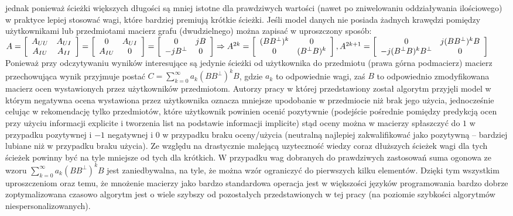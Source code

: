 \documentclass{pracamgr}
\begin{document}
    jednak ponieważ ścieżki większych długości są mniej istotne dla prawdziwych wartości (nawet po zniwelowaniu oddziaływania ilościowego)
    w praktyce lepiej stosować wagi, które bardziej premiują krótkie ścieżki.
    Jeśli model danych nie posiada żadnych krawędzi pomiędzy użytkownikami lub przedmiotami macierz grafu (dwudzielnego)
    można zapisać w uproszczony sposób:\newline
    $A=
     \left[\begin{array}{cc}
     A_{UU}&A_{UI}\\
     A_{IU}&A_{II}
     \end{array}\right]
     =
     \left[\begin{array}{cc}
     0&A_{UI}\\
     A_{IU}&0
     \end{array}\right]
     =
     \left[\begin{array}{cc}
     0&jB\\
     -jB^\bot&0
     \end{array}\right]
     \Rightarrow\newline
     A^{2k}=
     \left[\begin{array}{cc}
     (BB^\bot)^k&0\\
     0&(B^\bot B)^k
     \end{array}\right],
     A^{2k+1}=
     \left[\begin{array}{cc}
     0&j(BB^\bot)^kB\\
     -j(B^\bot B)^kB^\bot&0
     \end{array}\right]
    $\newline
    Ponieważ przy odczytywaniu wyników interesujące są jedynie ścieżki od użytkownika do przedmiotu (prawa górna podmacierz)
    macierz przechowująca wynik przyjmuje postać $C=\sum\limits_{k=0}^{\infty}a_k(BB^\bot)^kB$, gdzie $a_k$ to odpowiednie wagi,
    zaś $B$ to odpowiednio zmodyfikowana macierz ocen wystawionych przez użytkowników przedmiotom.
    Autorzy pracy w której przedstawiony został algorytm przyjęli model w którym negatywna ocena wystawiona przez użytkownika
    oznacza mniejsze upodobanie w przedmiocie niż brak jego użycia, jednocześnie celując w rekomendację tylko przedmiotów,
    które użytkownik powinien ocenić pozytywnie (podejście pośrednie pomiędzy predykcją ocen przy użyciu informacji explicite
    i tworzenia list na podstawie informacji implicite) stąd oceny można w macierzy spłaszczyć do $1$ w przypadku pozytywnej i $-1$ negatywnej
    i $0$ w przypadku braku oceny/użycia (neutralną najlepiej zakwalifikować jako pozytywną -- bardziej lubiane niż w przypadku braku użycia).
    Ze względu na drastycznie malejącą uzyteczność wiedzy coraz dłuższych ścieżek wagi dla tych ścieżek powinny być na tyle mniejsze od tych dla krótkich.
    W przypadku wag dobranych do prawdziwych zastosowań suma ogonowa ze wzoru $\sum\limits_{k=0}^{\infty}a_k(BB^\bot)^kB$ jest zaniedbywalna, na tyle,
    że można wzór ograniczyć do pierwszych kilku elementów.\newline
    Dzięki tym wszystkim uproszczeniom oraz temu,
    że mnożenie macierzy jako bardzo standardowa operacja jest w większości języków programowania bardzo dobrze zoptymalizowana czasowo algorytm
    jest o wiele szybszy od pozostałych przedstawionych w tej pracy (na poziomie szybkości algorytmów niespersonalizowanych).
\end{document}
